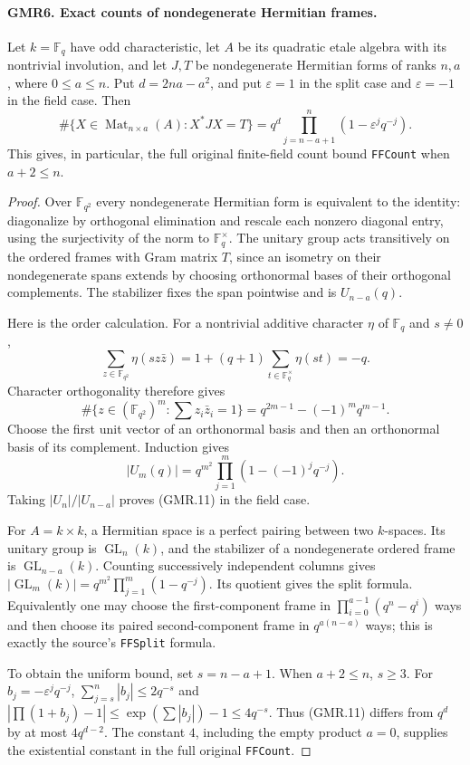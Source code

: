 \paragraph{GMR6. Exact counts of nondegenerate Hermitian frames.}
\label{claim:GMR6}
Let $k=\mathbb F_q$ have odd characteristic, let $A$ be its quadratic
etale algebra with its nontrivial involution, and let $J,T$ be
nondegenerate Hermitian forms of ranks $n,a$, where $0\leq a\leq n$.
Put $d=2na-a^2$, and put $\varepsilon=1$ in the split case and
$\varepsilon=-1$ in the field case.  Then
\[
 \#\{X\in\operatorname{Mat}_{n\times a}(A):X^*JX=T\}
  =q^d\prod_{j=n-a+1}^{n}(1-\varepsilon^j q^{-j}).
 \tag{GMR.11}
\]
This gives, in particular, the full original finite-field count bound
\texttt{FFCount} when $a+2\leq n$.

\begin{proof}
Over $\mathbb F_{q^2}$ every nondegenerate Hermitian form is equivalent
to the identity: diagonalize by orthogonal elimination and rescale
each nonzero diagonal entry, using the surjectivity of the norm to
$\mathbb F_q^\times$.  The unitary group acts transitively on the
ordered frames with Gram matrix $T$, since an isometry on their
nondegenerate spans extends by choosing orthonormal bases of their
orthogonal complements.  The stabilizer fixes the span pointwise and
is $U_{n-a}(q)$.

Here is the order calculation.  For a nontrivial additive character
$\eta$ of $\mathbb F_q$ and $s\ne0$,
\[
 \sum_{z\in\mathbb F_{q^2}}\eta(s z\bar z)
   =1+(q+1)\sum_{t\in\mathbb F_q^\times}\eta(st)=-q.
\]
Character orthogonality therefore gives
\[
 \#\{z\in(\mathbb F_{q^2})^m:\textstyle\sum z_i\bar z_i=1\}
  =q^{2m-1}-(-1)^m q^{m-1}.
\]
Choose the first unit vector of an orthonormal basis and then an
orthonormal basis of its complement.  Induction gives
\[
 |U_m(q)|=q^{m^2}\prod_{j=1}^{m}(1-(-1)^j q^{-j}).
 \tag{GMR.12}
\]
Taking $|U_n|/|U_{n-a}|$ proves (GMR.11) in the field case.

For $A=k\times k$, a Hermitian space is a perfect pairing between two
$k$-spaces.  Its unitary group is $\operatorname{GL}_n(k)$, and the
stabilizer of a nondegenerate ordered frame is
$\operatorname{GL}_{n-a}(k)$.  Counting successively independent
columns gives $|\operatorname{GL}_m(k)|=q^{m^2}\prod_{j=1}^m(1-q^{-j})$.
Its quotient gives the split formula.  Equivalently one may choose
the first-component frame in $\prod_{i=0}^{a-1}(q^n-q^i)$ ways and
then choose its paired second-component frame in $q^{a(n-a)}$ ways;
this is exactly the source's \texttt{FFSplit} formula.

To obtain the uniform bound, set $s=n-a+1$.  When $a+2\leq n$, $s\geq3$.
For $b_j=-\varepsilon^j q^{-j}$,
$\sum_{j=s}^n|b_j|\leq2q^{-s}$ and
$|\prod(1+b_j)-1|\leq\exp(\sum|b_j|)-1\leq4q^{-s}$.
Thus (GMR.11) differs from $q^d$ by at most $4q^{d-2}$.
The constant $4$, including the empty product $a=0$, supplies the
existential constant in the full original \texttt{FFCount}.
\end{proof}

